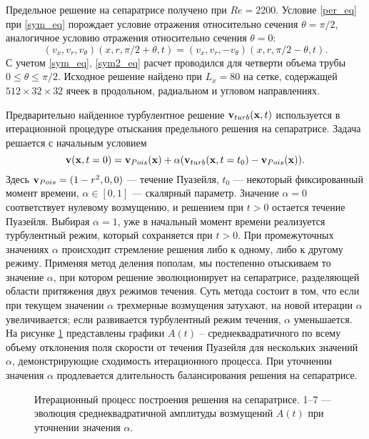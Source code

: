 Предельное решение на сепаратрисе получено при $Re=2200$. Условие \eqref{per_eq} при \eqref{sym_eq} порождает условие отражения относительно сечения $\theta = \pi/2$, аналогичное условию отражения относительно сечения $\theta = 0$:
\begin{equation} \label{sym2_eq}
(v_x, v_r, v_\theta)(x, r, \pi/2 + \theta, t) = (v_x, v_r, -v_\theta)(x, r, \pi / 2 - \theta, t).
\end{equation}
С учетом \eqref{sym_eq}, \eqref{sym2_eq} расчет проводился для четверти объема трубы $0\leqslant\theta\leqslant\pi/2$. Исходное решение найдено при $L_x = 80$ на сетке, содержащей $512 \times 32 \times  32$ ячеек в продольном, радиальном и угловом направлениях. 

Предварительно найденное турбулентное решение $\mathbf{v}_{turb}(\mathbf{x},t)$ используется в итерационной процедуре отыскания предельного решения на сепаратрисе. Задача решается с начальным условием
\begin{equation} \label{edge_init_eq}
\mathbf{v}(\mathbf{x},t=0) = \mathbf{v}_{Pois}(\mathbf{x})+\alpha(\mathbf{v}_{turb}(\mathbf{x},t=t_0) - \mathbf{v}_{Pois}(\mathbf{x})).
\end{equation}
Здесь $\mathbf{v}_{Pois}=(1-r^2,0,0)$ --- течение Пуазейля, $t_0$ --- некоторый фиксированный момент времени, $\alpha \in [0,1]$ --- скалярный параметр. Значение $\alpha=0$ соответствует нулевому возмущению, и решением при $t > 0$ остается течение Пуазейля. Выбирая $\alpha=1$, уже в начальный момент времени реализуется турбулентный режим, который сохраняется при $t > 0$. При промежуточных значениях $\alpha$ происходит стремление решения либо к одному, либо к другому режиму. Применяя метод деления пополам, мы постепенно отыскиваем то значение $\alpha$, при котором решение эволюционирует на сепаратрисе, разделяющей области притяжения двух режимов течения. Суть метода состоит в том, что если при текущем значении $\alpha$ трехмерные возмущения затухают, на новой итерации $\alpha$ увеличивается; если развивается турбулентный режим течения, $\alpha$ уменьшается. На рисунке \ref{bisection_pic} представлены графики $A(t)$ – среднеквадратичного по всему объему отклонения поля скорости от течения Пуазейля для нескольких значений $\alpha$, демонстрирующие сходимость итерационного процесса. При уточнении значения $\alpha$ продлевается длительность балансирования решения на сепаратрисе.


\begin{figure}
\caption{Итерационный процесс построения решения на сепаратрисе. 1--7 --- эволюция среднеквадратичной амплитуды возмущений $A(t)$ при уточнении значения $\alpha$.}
\label{bisection_pic}
\end{figure}

